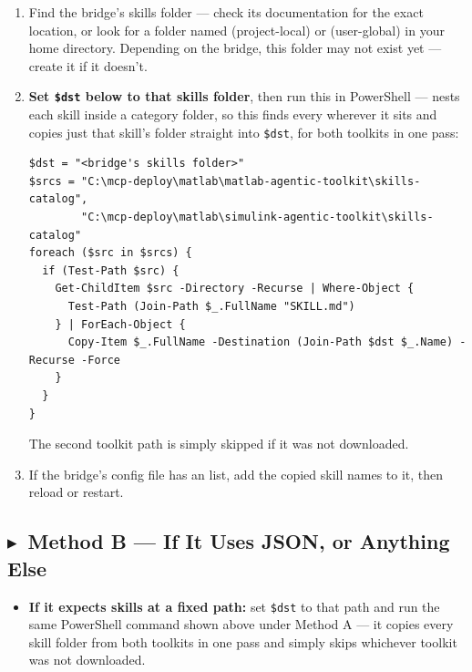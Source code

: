 \documentclass[11pt, letterpaper]{article}
\newcommand{\methodB}{\subsection*{\color{TSmaroon}$\blacktriangleright$~Method B --- If It Uses JSON, or Anything Else}}
\begin{document}
\begin{enumerate}
  \item Find the bridge's skills folder --- check its documentation for the exact location, or
        look for a folder named  (project-local) or
         (user-global) in your home directory. Depending on the bridge,
        this folder may not exist yet --- create it if it doesn't.

  \item \textbf{Set \texttt{\$dst} below to that skills folder}, then run this in PowerShell ---
         nests each skill inside a category folder, so this finds every
         wherever it sits and copies just that skill's folder straight into
        \texttt{\$dst}, for both toolkits in one pass:

  \begin{codeblocknobreak}
  \begin{Verbatim}
$dst = "<bridge's skills folder>"
$srcs = "C:\mcp-deploy\matlab\matlab-agentic-toolkit\skills-catalog",
        "C:\mcp-deploy\matlab\simulink-agentic-toolkit\skills-catalog"
foreach ($src in $srcs) {
  if (Test-Path $src) {
    Get-ChildItem $src -Directory -Recurse | Where-Object {
      Test-Path (Join-Path $_.FullName "SKILL.md")
    } | ForEach-Object {
      Copy-Item $_.FullName -Destination (Join-Path $dst $_.Name) -Recurse -Force
    }
  }
}
  \end{Verbatim}
  \end{codeblocknobreak}

        The second toolkit path is simply skipped if it was not downloaded.

  \item If the bridge's config file has an  list, add the copied skill
        names to it, then reload or restart.
\end{enumerate}

\methodB

\begin{itemize}
  \item \textbf{If it expects skills at a fixed path:} set \texttt{\$dst} to that path and run
        the same PowerShell command shown above under Method A --- it copies every skill folder
        from both toolkits in one pass and simply skips whichever toolkit was not downloaded.
\end{itemize}


\end{document}
